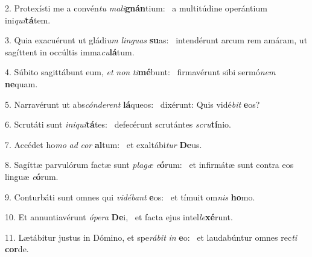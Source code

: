 2. Protexísti me a convén\textit{tu} \textit{ma}\textit{li}\textbf{gnán}tium: \ast\  a multitúdine operántium ini\textit{qui}\textbf{tá}tem.\

3. Quia exacuérunt ut gládi\textit{um} \textit{lin}\textit{guas} \textbf{su}as: \ast\  intendérunt arcum rem amáram, ut sagíttent in occúltis imma\textit{cu}\textbf{lá}tum.\

4. Súbito sagittábunt eum, \textit{et} \textit{non} \textit{ti}\textbf{mé}bunt: \ast\  firmavérunt sibi sermó\textit{nem} \textbf{ne}quam.\

5. Narravérunt ut abs\textit{cón}\textit{de}\textit{rent} \textbf{lá}queos: \ast\  dixérunt: Quis vidé\textit{bit} \textbf{e}os?\

6. Scrutáti sunt \textit{in}\textit{i}\textit{qui}\textbf{tá}tes: \ast\  defecérunt scrutántes \textit{scru}\textbf{tí}nio.\

7. Accédet ho\textit{mo} \textit{ad} \textit{cor} \textbf{al}tum: \ast\  et exaltábi\textit{tur} \textbf{De}us.\

8. Sagíttæ parvulórum factæ sunt \textit{pla}\textit{gæ} \textit{e}\textbf{ó}rum: \ast\  et infirmátæ sunt contra eos linguæ \textit{e}\textbf{ó}rum.\

9. Conturbáti sunt omnes qui \textit{vi}\textit{dé}\textit{bant} \textbf{e}os: \ast\  et tímuit om\textit{nis} \textbf{ho}mo.\

10. Et annuntiavérunt \textit{ó}\textit{pe}\textit{ra} \textbf{De}i, \ast\  et facta ejus intel\textit{le}\textbf{xé}runt.\

11. Lætábitur justus in Dómino, et spe\textit{rá}\textit{bit} \textit{in} \textbf{e}o: \ast\  et laudabúntur omnes rec\textit{ti} \textbf{cor}de.\

